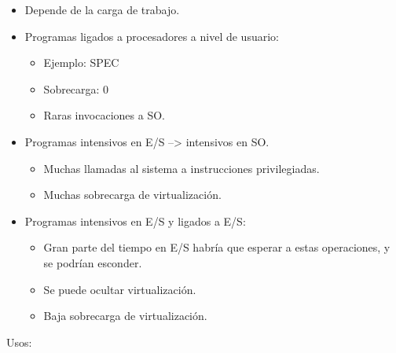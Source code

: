 \documentclass[12pt, twoside, openright]{report} %
\begin{document}
    \begin{itemize}
    
    \item
      Depende de la carga de trabajo.
    \item
      Programas ligados a procesadores a nivel de usuario:

      \begin{itemize}
      
      \item
        Ejemplo: SPEC
      \item
        Sobrecarga: 0
      \item
        Raras invocaciones a SO.
      \end{itemize}
    \item
      Programas intensivos en E/S --\textgreater{} intensivos en SO.

      \begin{itemize}
      
      \item
        Muchas llamadas al sistema a instrucciones privilegiadas.
      \item
        Muchas sobrecarga de virtualización.
      \end{itemize}
    \item
      Programas intensivos en E/S y ligados a E/S:

      \begin{itemize}
      
      \item
        Gran parte del tiempo en E/S habría que esperar a estas
        operaciones, y se podrían esconder.
      \item
        Se puede ocultar virtualización.
      \item
        Baja sobrecarga de virtualización.
      \end{itemize}
    \end{itemize}

    Usos:
\end{document}
